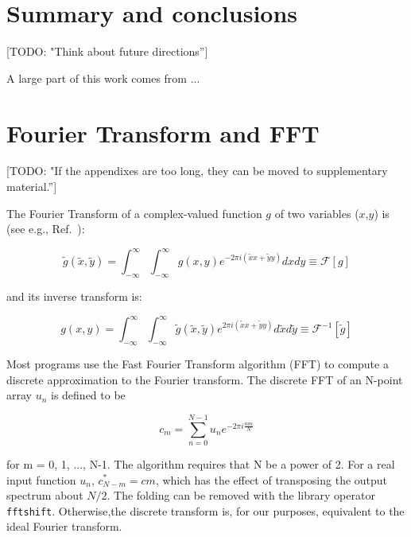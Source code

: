 \documentclass{iucr}              %
\newcommand{\todo}[1]{{\color{red}[TODO: "#1'']}}
\begin{document}
\section{Summary and conclusions}

\todo{Think about future directions}

%
%
A large part of this work comes from ...

\appendix
\section{Fourier Transform and FFT}
\label{appendix_fft}

\todo{If the appendixes are too long, they can be moved to supplementary material.}

The Fourier Transform of a complex-valued function $g$ of two variables ($x$,$y$) is (see e.g., Ref.~\cite{goodmanfourier}): 

\begin{equation}
\tilde{g}(\tilde{x},\tilde{y}) = \int_{-\infty}^\infty \int_{-\infty}^\infty g(x,y) e^{-2 \pi i (\tilde{x}x + \tilde{y}y)} dx dy \equiv \mathcal{F}[g]
\end{equation}

and its inverse transform is: 

\begin{equation}
g(x,y) = \int_{-\infty}^\infty \int_{-\infty}^\infty \tilde{g}(\tilde{x},\tilde{y}) e^{2 \pi i (\tilde{x}x + \tilde{y}y)} d\tilde{x} d\tilde{y} \equiv \mathcal{F}^{-1}[\tilde{g}]
\end{equation}

Most programs use the Fast Fourier Transform algorithm (FFT) to compute a discrete approximation to the Fourier transform. The discrete FFT of an N-point array
$u_n$ is defined to be

\begin{equation}
 c_m = \sum_{n=0}^{N-1} u_n e^{-2 \pi i \frac{n m}{N}}
\end{equation}

for m = 0, 1, ..., N-1. The algorithm requires that N be a power of 2. For a real input function $u_n$, $c_{N-m}^\ast = cm$, which has the effect of transposing the output spectrum about $N/2$. The folding can be removed with the library operator {\tt fftshift}. Otherwise,the discrete transform is, for our purposes, equivalent to the ideal Fourier transform.
\end{document}
